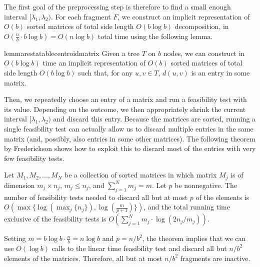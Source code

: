 \documentclass[a4paper,UKenglish]{lipics-v2016}
\theoremstyle{plain}
\begin{document}
The first goal of the preprocessing step is therefore to find a small enough interval $[\lambda_1,\lambda_2)$.
For each fragment $F$, we construct an implicit representation of $O(b)$ sorted matrices of total side length $O(b\log b)$
decomposition, in $O(\frac n b \cdot b\log b)=O(n\log b)$ total time using the following lemma. 
\begin{restatable}{lemmarestatable}{centroidmatrix}
Given a tree $T$ on $b$ nodes, we can construct in $O(b\log b)$ time an implicit representation of $O(b)$ sorted matrices of total
side length $O(b\log b)$ such that, for any $u,v\in T$, $d(u,v)$ is an entry in some matrix.
\end{restatable}
Then, we repeatedly choose an entry of a matrix and run a feasibility test with its value.  %
Depending on the outcome, we then appropriately shrink the current interval $[\lambda_{1},\lambda_{2})$ and discard this entry.
Because the matrices are sorted, running a single feasibility test can actually allow us to discard multiple entries in the same matrix
(and, possibly, also entries in some other matrices). The following theorem by Frederickson shows how to exploit this to discard most
of the entries with very few feasibility tests.

\begin{theorem}\label{Frederickson's theorem}
Let  ${M_1, M_2, . . . , M_N}$ be a collection of sorted matrices in which matrix $M_j$ is of dimension $m_j \times n_j$, $m_j \leq n_j$, and $\sum_{j=1}^{N} m_j = m$.
Let $p$ be nonnegative. The number of feasibility tests needed to discard all but at most $p$ of the elements is $O(\max \lbrace \log(\max_{j} \lbrace n_j \rbrace), \log(\frac{m}{p+1}) \rbrace)$, and the total running time exclusive of the feasibility tests is $O(\sum_{j=1}^{N} m_j \cdot \log (2n_j/m_j))$.
\end{theorem}

Setting $m=b \log b \cdot \frac{n}{b} = n \log b$ and $p=n/b^2$, the theorem implies that we can use $O(\log b)$ calls to the linear time feasibility test and discard all but $n/b^2$ elements of the matrices. Therefore, all but at most $n/b^{2}$ fragments are inactive.
\end{document}
